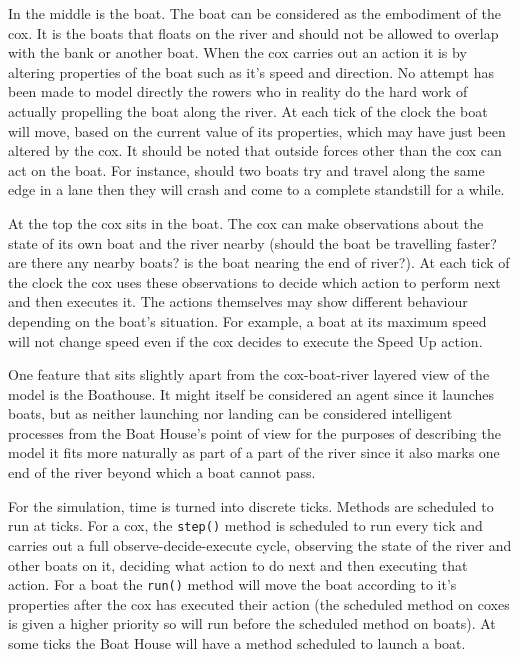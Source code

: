     In the middle is the boat. The boat can be considered as the embodiment of the cox. It is the boats that floats on the river and should not be allowed to overlap with the bank or another boat. When the cox carries out an action it is by altering properties of the boat such as it's speed and direction. No attempt has been made to model directly the rowers who in reality do the hard work of actually propelling the boat along the river. At each tick of the clock the boat will move, based on the current value of its properties, which may have just been altered by the cox. It should be noted that outside forces other than the cox can act on the boat. For instance, should two boats try and travel along the same edge in a lane then they will crash and come to a complete standstill for a while.
    
    At the top the cox sits in the boat. The cox can make observations about the state of its own boat and the river nearby (should the boat be travelling faster? are there any nearby boats? is the boat nearing the end of river?). At each tick of the clock the cox uses these observations to decide which action to perform next and then executes it. The actions themselves may show different behaviour depending on the boat's situation. For example, a boat at its maximum speed will not change speed even if the cox decides to execute the Speed Up action.
    
    One feature that sits slightly apart from the cox-boat-river layered view of the model is the Boathouse. It might itself be considered an agent since it launches boats, but as neither launching nor landing can be considered intelligent processes from the Boat House's point of view for the purposes of describing the model it fits more naturally as part of a part of the river since it also marks one end of the river beyond which a boat cannot pass.
    
    For the simulation, time is turned into discrete ticks. Methods are scheduled to run at ticks. For a cox, the \texttt{step()} method is scheduled to run every tick and carries out a full observe-decide-execute cycle, observing the state of the river and other boats on it, deciding what action to do next and then executing that action. For a boat the \texttt{run()} method will move the boat according to it's properties after the cox has executed their action (the scheduled method on coxes is given a higher priority so will run before the scheduled method on boats). At some ticks the Boat House will have a method scheduled to launch a boat.
    
